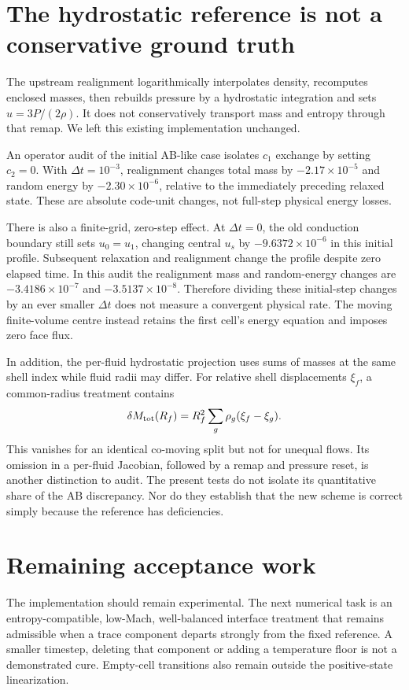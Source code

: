 \documentclass[11pt]{article}
\begin{document}
\section{The hydrostatic reference is not a conservative ground truth}
The upstream realignment logarithmically interpolates density, recomputes
enclosed masses, then rebuilds pressure by a hydrostatic integration and
sets $u=3P/(2\rho)$. It does not conservatively transport mass and entropy
through that remap. We left this existing implementation unchanged.

An operator audit of the initial AB-like case isolates $c_1$ exchange by
setting $c_2=0$. With $\Delta t=10^{-3}$, realignment changes total mass by
$-2.17\times10^{-5}$ and random energy by $-2.30\times10^{-6}$, relative to
the immediately preceding relaxed state. These are absolute code-unit
changes, not full-step physical energy losses.

There is also a finite-grid, zero-step effect. At $\Delta t=0$, the old
conduction boundary still sets $u_0=u_1$, changing central $u_s$ by
$-9.6372\times10^{-6}$ in this initial profile. Subsequent relaxation and
realignment change the profile despite zero elapsed time. In this audit
the realignment mass and random-energy changes are
$-3.4186\times10^{-7}$ and $-3.5137\times10^{-8}$. Therefore dividing these
initial-step changes by an ever smaller $\Delta t$ does not measure a
convergent physical rate. The moving finite-volume centre instead retains
the first cell's energy equation and imposes zero face flux.

In addition, the per-fluid hydrostatic projection uses sums of masses at
the same shell index while fluid radii may differ. For relative shell
displacements $\xi_f$, a common-radius treatment contains
\begin{equation}
 \delta M_{\rm tot}(R_f)=R_f^2\sum_g\rho_g(\xi_f-\xi_g).
\end{equation}
This vanishes for an identical co-moving split but not for unequal flows.
Its omission in a per-fluid Jacobian, followed by a remap and pressure
reset, is another distinction to audit. The present tests do not isolate
its quantitative share of the AB discrepancy. Nor do they establish that
the new scheme is correct simply because the reference has deficiencies.

\section{Remaining acceptance work}
The implementation should remain experimental. The next numerical task
is an entropy-compatible, low-Mach, well-balanced interface treatment
that remains admissible when a trace component departs strongly from the
fixed reference. A smaller timestep, deleting that component or adding a
temperature floor is not a demonstrated cure. Empty-cell transitions also
remain outside the positive-state linearization.
\end{document}
